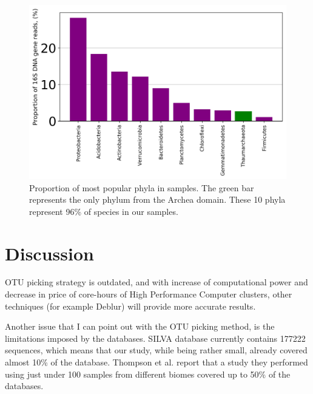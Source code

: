 \documentclass[12pt]{article}
\begin{document}
\begin{multicols}{2}
\begin{figure}[H]
	\captionsetup{width=\linewidth}
	\includegraphics[width=\linewidth]{../taxonomy/top_10.png}
	\caption{Proportion of most popular phyla in samples. The green bar represents the only phylum from the Archea domain. These 10 phyla represent 96\% of species in our samples.}
	\label{fig:top_taxa}
\end{figure}
%
%
\section{Discussion}
OTU picking strategy is outdated, and with increase of computational power and decrease in price of core-hours of High Performance Computer clusters, other techniques (for example Deblur\cite{Amir}) will provide more accurate results.
\par

Another issue that I can point out with the OTU picking method, is the limitations imposed by the databases. SILVA database currently contains 177222 sequences, which means that our study, while being rather small, already covered almost 10\% of the database. Thompson et al.\cite{Thompson2017} report that a study they performed using just under 100 samples from different biomes covered up to 50\% of the databases.

\newpage


\end{multicols}
\end{document}
